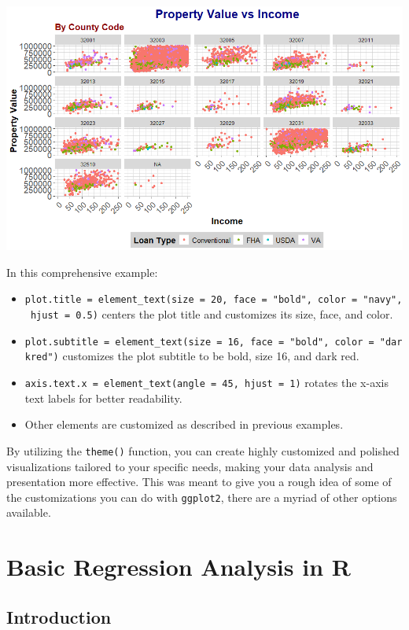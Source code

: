 \documentclass[
]{book}
\begin{document}
\includegraphics{images/custom_theme_4.PNG}

In this comprehensive example:

\begin{itemize}
\item
  \texttt{plot.title\ =\ element\_text(size\ =\ 20,\ face\ =\ "bold",\ color\ =\ "navy",\ hjust\ =\ 0.5)} centers the plot title and customizes its size, face, and color.
\item
  \texttt{plot.subtitle\ =\ element\_text(size\ =\ 16,\ face\ =\ "bold",\ color\ =\ "darkred")} customizes the plot subtitle to be bold, size 16, and dark red.
\item
  \texttt{axis.text.x\ =\ element\_text(angle\ =\ 45,\ hjust\ =\ 1)} rotates the x-axis text labels for better readability.
\item
  Other elements are customized as described in previous examples.
\end{itemize}

By utilizing the \texttt{theme()} function, you can create highly customized and polished visualizations tailored to your specific needs, making your data analysis and presentation more effective. This was meant to give you a rough idea of some of the customizations you can do with \texttt{ggplot2}, there are a myriad of other options available.

\hypertarget{basic-regression-analysis-in-r}{%
\chapter{Basic Regression Analysis in R}\label{basic-regression-analysis-in-r}}

\hypertarget{introduction-2}{%
\section{Introduction}\label{introduction-2}}
\end{document}
